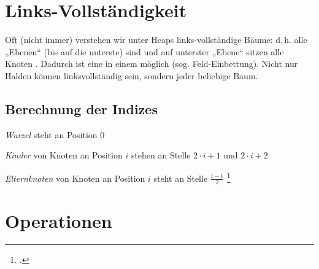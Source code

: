 \documentclass{lehramt-informatik}
\begin{document}
%

\section{Links-Vollständigkeit}

Oft (nicht immer) verstehen wir unter Heaps links-vollständige Bäume:
d.\,h. alle „Ebenen“ (bis auf die unterste) sind 
und auf unterster „Ebene“ sitzen alle Knoten . Dadurch ist eine  in einem
 möglich (sog. Feld-Einbettung). Nicht nur Halden können
linksvollständig sein, sondern jeder beliebige Baum.

%

\subsection{Berechnung der Indizes}

\begin{compactitem}
\item \emph{Wurzel} steht an Position $0$

\item \emph{Kinder} von Knoten an Position $i$ stehen an Stelle
$2 \cdot i + 1$ und $2 \cdot i + 2$

\item \emph{Elternknoten} von Knoten an Position $i$ steht an Stelle
$\frac{i - 1}{2}$
\footcite[Seite 26]{aud:fs:tafeluebung-11}
\end{compactitem}

\begin{center}
\end{center}

%

\section{Operationen}
\end{document}
